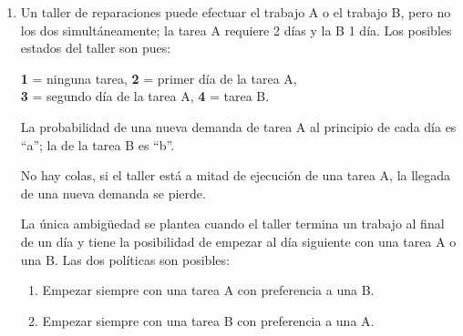 \documentclass{templateNote}
\begin{document}
\begin{enumerate}[start = 2]

    \newpage
    \item Un taller de reparaciones puede efectuar el trabajo A o el trabajo B, pero no los dos
    simultáneamente; la tarea A requiere 2 días y la B 1 día. Los posibles estados del taller son
    pues:

    \begin{center}
        \textbf{1} = ninguna tarea, \textbf{2} = primer día de la tarea A, \\\textbf{3} = segundo día de la tarea A, \textbf{4} = tarea B.
    \end{center}

    La probabilidad de una nueva demanda de tarea A al principio de cada día es “a”; la de la tarea B es “b”. 

    No hay colas, si el taller está a mitad de ejecución de una tarea A, la llegada de una nueva demanda se pierde. 

    La única ambigüedad se plantea cuando el taller termina un trabajo al final de un día y tiene la posibilidad de empezar al día siguiente con una tarea A o una B. Las dos políticas son posibles:

    \begin{enumerate}[label = \arabic*)]
        \item Empezar siempre con una tarea A con preferencia a una B.
        \item Empezar siempre con una tarea B con preferencia a una A.
    \end{enumerate}


\end{enumerate}
\end{document}
